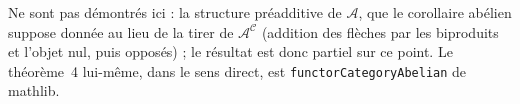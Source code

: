 Ne sont pas démontrés ici : la structure préadditive de $\mathcal A$, que le corollaire abélien suppose donnée au lieu de la tirer de $\mathcal A^{\mathcal C}$ (addition des flèches par les biproduits et l'objet nul, puis opposés) ; le résultat est donc partiel sur ce point. Le théorème~4 lui-même, dans le sens direct, est \texttt{functorCategoryAbelian} de mathlib.

